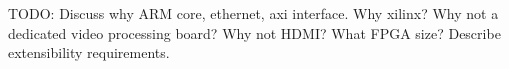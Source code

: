TODO: Discuss why ARM core, ethernet, axi interface. Why xilinx? Why not a dedicated video processing board? Why not HDMI? What FPGA size? Describe extensibility requirements.